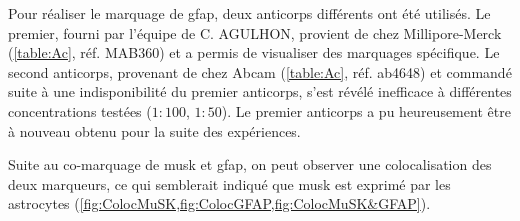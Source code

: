 	Pour réaliser le marquage de \gls{gfap}, deux anticorps différents ont été utilisés. Le premier, fourni par l'équipe de C. AGULHON, provient de chez Millipore-Merck (\cref{table:Ac}, réf. MAB360) et a permis de visualiser des marquages spécifique. Le second anticorps, provenant de chez Abcam (\cref{table:Ac}, réf. ab4648) et commandé suite à une indisponibilité du premier anticorps, s'est révélé inefficace à différentes concentrations testées ($1{:}100$, $1{:}50$). Le premier anticorps a pu heureusement être à nouveau obtenu pour la suite des expériences.
	
	Suite au co-marquage de \gls{musk} et \gls{gfap}, on peut observer une colocalisation des deux marqueurs, ce qui semblerait indiqué que \gls{musk} est exprimé par les astrocytes (\cref{fig:ColocMuSK,fig:ColocGFAP,fig:ColocMuSK&GFAP}).
	
